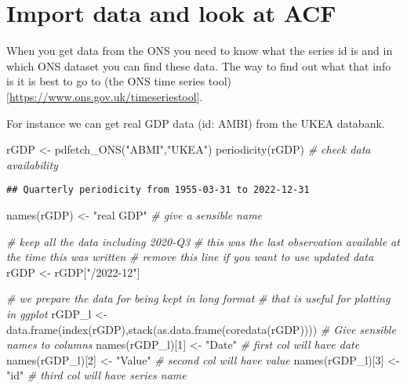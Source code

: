 \documentclass[
]{article}
\newenvironment{Shaded}{\begin{snugshade}}{\end{snugshade}}
\newcommand{\CommentTok}[1]{\textcolor[rgb]{0.56,0.35,0.01}{\textit{#1}}}
\newcommand{\DecValTok}[1]{\textcolor[rgb]{0.00,0.00,0.81}{#1}}
\newcommand{\FunctionTok}[1]{\textcolor[rgb]{0.00,0.00,0.00}{#1}}
\newcommand{\NormalTok}[1]{#1}
\newcommand{\OtherTok}[1]{\textcolor[rgb]{0.56,0.35,0.01}{#1}}
\newcommand{\StringTok}[1]{\textcolor[rgb]{0.31,0.60,0.02}{#1}}
\begin{document}
\hypertarget{import-data-and-look-at-acf}{%
\section{Import data and look at
ACF}\label{import-data-and-look-at-acf}}

When you get data from the ONS you need to know what the series id is
and in which ONS dataset you can find these data. The way to find out
what that info is it is best to go to (the ONS time series
tool){[}\url{https://www.ons.gov.uk/timeseriestool}{]}.

For instance we can get real GDP data (id: AMBI) from the UKEA databank.

\begin{Shaded}
\begin{Highlighting}[]
\NormalTok{rGDP }\OtherTok{\textless{}{-}} \FunctionTok{pdfetch\_ONS}\NormalTok{(}\StringTok{"ABMI"}\NormalTok{,}\StringTok{"UKEA"}\NormalTok{)  }
\FunctionTok{periodicity}\NormalTok{(rGDP)   }\CommentTok{\# check data availability}
\end{Highlighting}
\end{Shaded}

\begin{verbatim}
## Quarterly periodicity from 1955-03-31 to 2022-12-31
\end{verbatim}

\begin{Shaded}
\begin{Highlighting}[]
\FunctionTok{names}\NormalTok{(rGDP) }\OtherTok{\textless{}{-}} \StringTok{"real GDP"} \CommentTok{\# give a sensible name}

\CommentTok{\# keep all the data including 2020{-}Q3}
\CommentTok{\# this was the last observation available at the time this was written}
\CommentTok{\# remove this line if you want to use updated data}
\NormalTok{rGDP }\OtherTok{\textless{}{-}}\NormalTok{ rGDP[}\StringTok{"/2022{-}12"}\NormalTok{]  }

\CommentTok{\# we prepare the data for being kept in long format}
\CommentTok{\# that is useful for plotting in ggplot}
\NormalTok{rGDP\_l }\OtherTok{\textless{}{-}} \FunctionTok{data.frame}\NormalTok{(}\FunctionTok{index}\NormalTok{(rGDP),}\FunctionTok{stack}\NormalTok{(}\FunctionTok{as.data.frame}\NormalTok{(}\FunctionTok{coredata}\NormalTok{(rGDP))))}
\CommentTok{\# Give sensible names to columns}
\FunctionTok{names}\NormalTok{(rGDP\_l)[}\DecValTok{1}\NormalTok{] }\OtherTok{\textless{}{-}} \StringTok{"Date"}   \CommentTok{\# first col will have date}
\FunctionTok{names}\NormalTok{(rGDP\_l)[}\DecValTok{2}\NormalTok{] }\OtherTok{\textless{}{-}} \StringTok{"Value"}  \CommentTok{\# second col will have value}
\FunctionTok{names}\NormalTok{(rGDP\_l)[}\DecValTok{3}\NormalTok{] }\OtherTok{\textless{}{-}} \StringTok{"id"}     \CommentTok{\# third col will have series name}
\end{Highlighting}
\end{Shaded}
\end{document}
